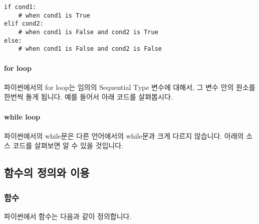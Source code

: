 \documentclass[twoside]{article}
\begin{document}
\begin{lstlisting}[style=python] 
if cond1:
    # when cond1 is True 
elif cond2:
    # when cond1 is False and cond2 is True
else:
    # when cond1 is False and cond2 is False
\end{lstlisting}


% 



\paragraph{for loop} 파이썬에서의 for loop는 임의의 Sequential Type 변수에 대해서, 그 변수 안의 원소를 한번씩 돌게 됩니다. 예를 들어서 아래 코드를 살펴봅시다. 




\paragraph{while loop} 파이썬에서의 while문은 다른 언어에서의 while문과 크게 다르지 않습니다. 아래의 소스 코드를 살펴보면 알 수 있을 것입니다. 



                
                
\subsection{함수의 정의와 이용}

\subsubsection{함수}

파이썬에서 함수는 다음과 같이 정의합니다. 



                
\end{document}
